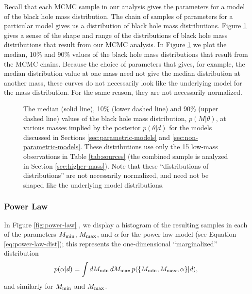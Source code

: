\documentclass[preprint]{aastex}
\newcommand{\Mmin}{M_{\textnormal{min}}}
\newcommand{\Mmax}{M_{\textnormal{max}}}
\begin{document}
Recall that each MCMC sample in our analysis gives the parameters for
a model of the black hole mass distribution.  The chain of samples of
parameters for a particular model gives us a distribution of black
hole mass distributions.  Figure \ref{fig:dists} gives a sense of the
shape and range of the distributions of black hole mass distributions
that result from our MCMC analysis.  In Figure \ref{fig:dists} we plot
the median, 10\% and 90\% values of the black hole mass distributions
that result from the MCMC chains.  Because the choice of parameters
that gives, for example, the median distribution value at one mass
need not give the median distribution at another mass, these curves do
not necessarily look like the underlying model for the mass
distribution.  For the same reason, they are not necessarily
normalized.

\begin{figure}
  \begin{center}
  \end{center}
  \caption{\label{fig:dists} The median (solid line), 10\% (lower
    dashed line) and 90\% (upper dashed line) values of the black hole
    mass distribution, $p(M|\theta)$, at various masses implied by the
    posterior $p(\theta|d)$ for the models discussed in Sections
    \ref{sec:parametric-models} and \ref{sec:non-parametric-models}.
    These distributions use only the 15 low-mass observations in Table
    \ref{tab:sources} (the combined sample is analyzed in Section
    \ref{sec:higher-mass}).  Note that these ``distributions of
    distributions'' are not necessarily normalized, and need not be
    shaped like the underlying model distributions.}
\end{figure}

\subsubsection{Power Law}

In Figure \ref{fig:power-law} , we display a histogram of the
resulting samples in each of the parameters $\Mmin$, $\Mmax$, and
$\alpha$ for the power law model (see Equation
\eqref{eq:power-law-dist}); this represents the one-dimensional
``marginalized'' distribution
\begin{equation}
  \label{eq:alpha-pdf}
  p(\alpha|d) = \int d\Mmin\, d\Mmax\, p(\{\Mmin, \Mmax, \alpha\}|d),
\end{equation}
and similarly for $\Mmin$ and $\Mmax$.
\end{document}
